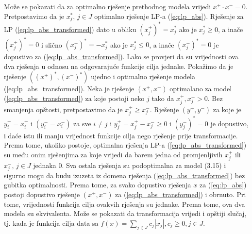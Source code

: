 \documentclass[b5paper, utf8, 11pt, colorlinks]{book}
\theoremstyle{definition}
\begin{document}
 Može se pokazati da za optimalno rješenje prethodnog modela vrijedi  $x^{+}\cdot x^{-}= 0$.  
   Pretpostavimo da je $x_j^*$, $j \in J$ optimalno rješenje LP-a (\ref{eq:lp_abs}). Rješenje za LP  (\ref{eq:lp_abs_transformed})  dato u obliku 
  $(x_j^+)^* = x_j^*$  ako je $x_j^* \geq 0$, a inače $(x_j^+)^* = 0$ i slično $(x_j^-)^* = - x_j^*$  ako je $x_j^* \leq 0$, a inače $(x_j^-)^* = 0$ je dopustivo za (\ref{eq:lp_abs_transformed}). Lako se provjeri da su vrijednosti ova dva rješenja u odnosu na odgovarajuće funkcije cilja jednake. Pokažimo da je rješenje  $((x^+)^*, (x^-)^*)$ ujedno i optimalno rješenje modela (\ref{eq:lp_abs_transformed}).   Neka je rješenje $(x^+, x^-)$ optimalano za model  (\ref{eq:lp_abs_transformed}) za koje postoji neko $j$ tako da  $x^{+}_j, x^{-}_j > 0$. Bez smanjenja opštosti, pretpostavimo da je $x^{+}_j \geq x^{-}_j$. 
  Rješenje $(y^+, y^-)$  za koje je $y^+_i = x^+_i$ i $(y^-_i = x^-_i)$ za sve $i \neq j$
   i $y^+_j = x^{+}_j - x^{-}_j \geq 0$ i $(y^-_j)^*=0$ je dopustivo, i daće istu ili manju vrijednost funkcije cilja nego rješenje prije transformacije. Prema tome, ukoliko postoje, optimalna rješenja LP-a (\ref{eq:lp_abs_transformed}) su među onim rješenjima za koje vrijedi da  barem jedna od promjenljivih $x_j^+$ ili $x_j^-$, $j \in J$  jednaka 0. Sva ostala rješenja su podoptimalna za model (3.15) i sigurno mogu da budu izuzeta iz domena rješenja (\ref{eq:lp_abs_transformed}) bez gubitka optimalnosti.   Prema tome, za svako dopustivo rješenja $x$ za (\ref{eq:lp_abs}) postoji dopustivo rješenje  $(x^+, x^-)$ za (\ref{eq:lp_abs_transformed}) i obrnuto. Pri tome, vrijednosti funkcija cilja ovakvih rješenja su jednake. Prema tome, ova dva modela su ekvivalenta. Može se pokazati da transformacija vrijedi i opštiji slučaj, tj. kada je funkcija cilja data sa $f(x)= \sum_{j \in J} c_j |x_j|, c_j \geq 0, j \in J$.
\end{document}

